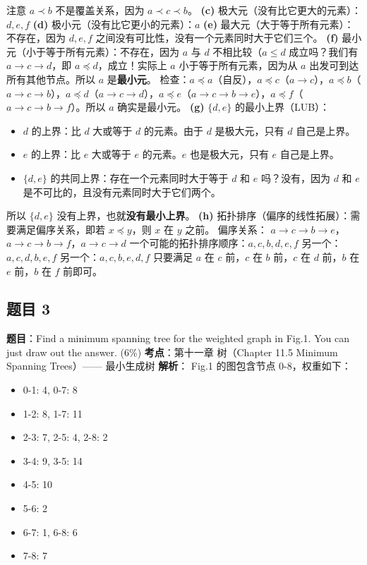 \documentclass[10pt,a4paper,openany]{ctexbook}
\theoremstyle{definition}
\theoremstyle{remark}
\begin{document}
注意 $a \prec b$ 不是覆盖关系，因为 $a \prec c \prec b$。
\textbf{(c)} 极大元（没有比它更大的元素）：$d, e, f$
\textbf{(d)} 极小元（没有比它更小的元素）：$a$
\textbf{(e)} 最大元（大于等于所有元素）：不存在，因为 $d, e, f$ 之间没有可比性，没有一个元素同时大于它们三个。
\textbf{(f)} 最小元（小于等于所有元素）：不存在，因为 $a$ 与 $d$ 不相比较（$a \le d$ 成立吗？我们有 $a \to c \to d$，即 $a \preceq d$，成立！实际上 $a$ 小于等于所有元素，因为从 $a$ 出发可到达所有其他节点。所以 $a$ 是\textbf{最小元}。
检查：$a \preceq a$（自反），$a \preceq c$（$a \to c$），$a \preceq b$（$a \to c \to b$），$a \preceq d$（$a \to c \to d$），$a \preceq e$（$a \to c \to b \to e$），$a \preceq f$（$a \to c \to b \to f$）。所以 $a$ 确实是最小元。
\textbf{(g)} $\{d, e\}$ 的最小上界（LUB）：
\begin{itemize}
\item $d$ 的上界：比 $d$ 大或等于 $d$ 的元素。由于 $d$ 是极大元，只有 $d$ 自己是上界。
\item $e$ 的上界：比 $e$ 大或等于 $e$ 的元素。$e$ 也是极大元，只有 $e$ 自己是上界。
\item $\{d, e\}$ 的共同上界：存在一个元素同时大于等于 $d$ 和 $e$ 吗？没有，因为 $d$ 和 $e$ 是不可比的，且没有元素同时大于它们两个。

\end{itemize}

所以 $\{d, e\}$ 没有上界，也就\textbf{没有最小上界}。
\textbf{(h)} 拓扑排序（偏序的线性拓展）：需要满足偏序关系，即若 $x \preceq y$，则 $x$ 在 $y$ 之前。
偏序关系：
$a \to c \to b \to e$，$a \to c \to b \to f$，$a \to c \to d$
一个可能的拓扑排序顺序：$a, c, b, d, e, f$
另一个：$a, c, d, b, e, f$
另一个：$a, c, b, e, d, f$
只要满足 $a$ 在 $c$ 前，$c$ 在 $b$ 前，$c$ 在 $d$ 前，$b$ 在 $e$ 前，$b$ 在 $f$ 前即可。
\vspace{-2pt}

\subsection{题目 3}

\textbf{题目}：Find a minimum spanning tree for the weighted graph in Fig.1. You can just draw out the answer. (6\%)
\textbf{考点}：第十一章 树（Chapter 11.5 Minimum Spanning Trees）—— 最小生成树
\textbf{解析}：
Fig.1 的图包含节点 0-8，权重如下：
\begin{itemize}
\item 0-1: 4, 0-7: 8
\item 1-2: 8, 1-7: 11
\item 2-3: 7, 2-5: 4, 2-8: 2
\item 3-4: 9, 3-5: 14
\item 4-5: 10
\item 5-6: 2
\item 6-7: 1, 6-8: 6
\item 7-8: 7

\end{itemize}
\end{document}
